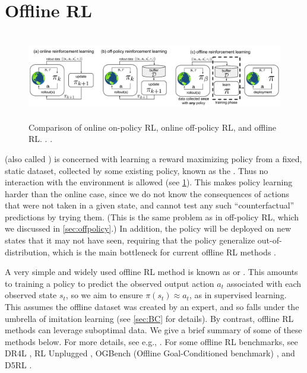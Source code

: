 \section{Offline RL}
\label{sec:offlineRL}

\begin{figure}
\centering
\includegraphics[height=1.5in]{figs/offlineRL}
\caption{
  Comparison of online on-policy RL,  online off-policy RL,
  and offline RL.
.
.
}
\label{fig:offline}
\end{figure}




(also called  \cite{Lange2012})
is concerned with learning a reward maximizing
policy from a fixed, static dataset,
collected by some existing policy,
known as the .
Thus no interaction with the environment is allowed
(see \cref{fig:offline}).
This makes policy learning harder than the online case,
since we do not know the consequences of actions that were not taken
in a given state, and cannot test any such ``counterfactual'' predictions
by trying them.
(This is the same problem as in off-policy RL, which we discussed in
\cref{sec:offpolicy}.)
In addition, the policy will be deployed on new states that it may not have seen,
requiring that the policy generalize out-of-distribution,
which is the main bottleneck for current offline RL methods \citep{Park2024value}.

A very simple and widely used offline RL method
is known as  or .
This amounts to training a policy to predict the observed
output action $a_t$ associated with each observed state $s_t$,
so we aim to ensure $\pi(s_t) \approx a_t$,
as in supervised learning.
This assumes the offline dataset was created by an expert,
and so falls under the umbrella of imitation learning
(see \cref{sec:BC} for details).
By contrast, offline RL methods can leverage suboptimal data.
We give a brief summary of some of these  methods below.
For more details, 
see e.g., \citep{Levine20Offline,Chen2024offlineRL,Cetin2024}.
For some offline RL benchmarks,
see DR4L \citep{Fu20}, RL Unplugged \citep{Gulcehre20},
OGBench (Offline Goal-Conditioned benchmark) \citep{Park2024},
and D5RL \citep{Rafailov2024}.

